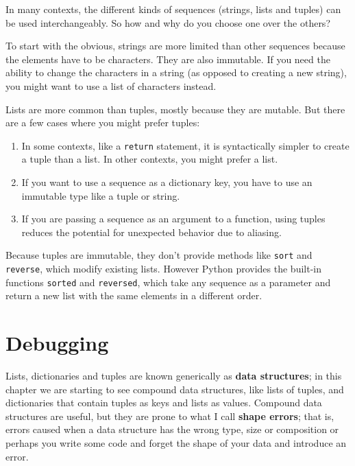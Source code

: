 \documentclass[10pt]{book}
\begin{document}
In many contexts, the different kinds of sequences (strings, lists and
tuples) can be used interchangeably.  So how and why do you choose one
over the others?


To start with the obvious, strings are more limited than other
sequences because the elements have to be characters.  They are
also immutable.  If you need the ability to change the characters
in a string (as opposed to creating a new string), you might
want to use a list of characters instead.

Lists are more common than tuples, mostly because they are mutable.
But there are a few cases where you might prefer tuples:

\begin{enumerate}

\item In some contexts, like a {\tt return} statement, it is
syntactically simpler to create a tuple than a list.  In other
contexts, you might prefer a list.

\item If you want to use a sequence as a dictionary key, you
have to use an immutable type like a tuple or string.

\item If you are passing a sequence as an argument to a function,
using tuples reduces the potential for unexpected behavior
due to aliasing.

\end{enumerate}

Because tuples are immutable, they don't provide methods
like {\tt sort} and {\tt reverse}, which modify existing lists.
However Python provides the built-in functions {\tt sorted}
and {\tt reversed}, which take any sequence as a parameter
and return a new list with the same elements in a different
order.



\section{Debugging}


Lists, dictionaries and tuples are known generically as {\bf data
  structures}; in this chapter we are starting to see compound data
structures, like lists of tuples, and dictionaries that contain tuples
as keys and lists as values.  Compound data structures are useful, but
they are prone to what I call {\bf shape errors}; that is, errors
caused when a data structure has the wrong type, size or composition
or perhaps you write some code and forget the shape of your data
and introduce an error.
\end{document}

